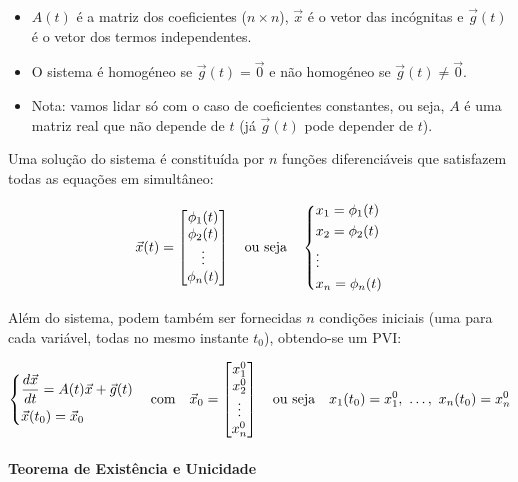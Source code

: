 \documentclass{article}
\begin{document}
\begin{itemize}
    \item $A(t)$ é a matriz dos coeficientes ($n \times n$), $\vec{x}$ é o vetor das incógnitas e
    $\vec{g}(t)$ é o vetor dos termos independentes.
    \item O sistema é homogéneo se $\vec{g}(t) = \vec{0}$ e não homogéneo se $\vec{g}(t) \neq \vec{0}$.
    \item Nota: vamos lidar só com o caso de coeficientes constantes, ou seja, $A$ é uma matriz real
    que não depende de $t$ (já $\vec{g}(t)$ pode depender de $t$).
\end{itemize}

Uma solução do sistema é constituída por $n$ funções diferenciáveis que satisfazem todas as equações
em simultâneo:

\begin{gather*}
\vec{x}(t) =
\begin{bmatrix}
\phi_1(t) \\
\phi_2(t) \\
\vdots \\
\phi_n(t)
\end{bmatrix}
\quad \text{ou seja} \quad
\begin{dcases}
x_1 = \phi_1(t) \\
x_2 = \phi_2(t) \\
\vdots \\
x_n = \phi_n(t)
\end{dcases}
\end{gather*}

Além do sistema, podem também ser fornecidas $n$ condições iniciais (uma para cada variável, todas no mesmo
instante $t_0$), obtendo-se um PVI:

\begin{gather*}
\begin{dcases}
\frac{d\vec{x}}{dt} = A(t)\vec{x} + \vec{g}(t) \\
\vec{x}(t_0) = \vec{x}_0
\end{dcases}
\quad \text{com} \quad
\vec{x}_0 =
\begin{bmatrix}
x_1^0 \\
x_2^0 \\
\vdots \\
x_n^0
\end{bmatrix}
\quad \text{ou seja} \quad
x_1(t_0) = x_1^0, \ \ldots, \ x_n(t_0) = x_n^0
\end{gather*}

\paragraph{Teorema de Existência e Unicidade}
\end{document}
